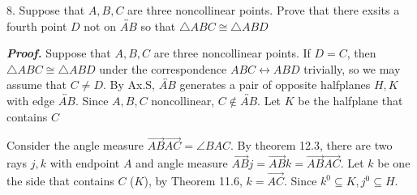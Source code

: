 \documentclass{report}
\title{\Huge{}}
\author{\huge{Nathan Warner}}
\date{\huge{}}
\begin{document}
    \begin{mdframed}
        8. Suppose that $A,B,C$ are three noncollinear points. Prove that there exsits a fourth point $D$ not on $\overleftrightarrow{AB}$ so that $\triangle ABC \cong \triangle ABD $
    \end{mdframed}
    \bigbreak \noindent 
    \textbf{\textit{Proof.}} Suppose that $A,B,C$ are three noncollinear points. If $D = C$, then $ \triangle ABC \cong \triangle ABD$ under the correspondence $ ABC \leftrightarrow ABD $ trivially, so we may assume that $ C \ne D$.
    \bigbreak \noindent 
    By Ax.S, $\overleftrightarrow{AB}$ generates a pair of opposite halfplanes $H,K$ with edge $\overleftrightarrow{AB}$. Since $A,B,C$ noncollinear, $C\not\in\overleftrightarrow{AB}$. Let $K$ be the halfplane that contains $C$
    \bigbreak \noindent 
    \begin{figure}[ht]
        \centering
        \label{fig:f1}
    \end{figure}
    \bigbreak \noindent 
    Consider the angle measure $\overrightarrow{AB}\overrightarrow{AC} = \angle BAC$. By theorem 12.3, there are two rays $j,k$ with endpoint $A$ and angle measure $\overrightarrow{AB}j = \overrightarrow{AB}k = \overrightarrow{AB}\overrightarrow{AC}$. Let $k$ be one the side that contains $C$ ($K$), by Theorem 11.6, $k = \overrightarrow{AC}$. Since $k^{0} \subseteq K, j^{0} \subseteq H$.
\end{document}
